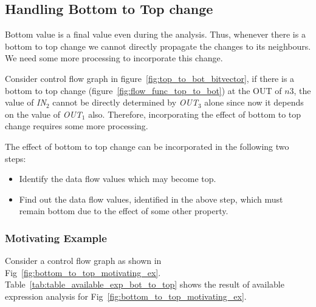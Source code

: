\documentclass[11pt,a4paper,openright]{report}
\begin{document}
\subsection{Handling Bottom to Top change}
Bottom value is a final value even during the analysis. Thus, whenever there is a bottom to top change we cannot directly propagate the changes to its neighbours. 
We need some more processing to incorporate this change.

Consider control flow graph in figure~\ref{fig:top_to_bot_bitvector}, if there is a bottom to top change (figure~\ref{fig:flow_func_top_to_bot}) at the OUT of $n3$, the value of \textit{IN}$_2$ cannot be directly 
determined by \textit{OUT}$_3$ alone since now it depends on the value of \textit{OUT}$_1$ also. Therefore, incorporating the effect of bottom to top change requires some more processing.

The effect of bottom to top change can be incorporated in the following two steps:
\begin{itemize}
\item{Identify the data flow values which may become top.}
\item{Find out the data flow values, identified in the above step, which must remain bottom due to the effect of some other property.}
\end{itemize}

\subsubsection{Motivating Example}
Consider a control flow graph as shown in Fig~\ref{fig:bottom_to_top_motivating_ex}. Table~\ref{tab:table_available_exp_bot_to_top} shows the result of available expression 
analysis for Fig~\ref{fig:bottom_to_top_motivating_ex}.
\end{document}
